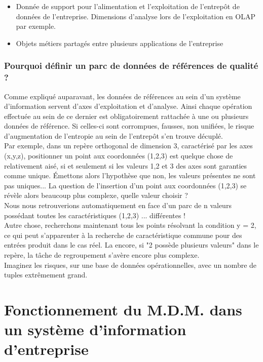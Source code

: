 \begin{itemize}
\item Donnée de support pour l'alimentation et l'exploitation de l'entrepôt de données de l'entreprise. Dimensions d'analyse lors de l'exploitation en OLAP par exemple.
\item Objets métiers partagés entre plusieurs applications de l'entreprise
\end{itemize}

\subsubsection{Pourquoi définir un parc de données de références de qualité ?}

Comme expliqué auparavant, les données de références au sein d'un système d'information servent d'axes d'exploitation et d'analyse. Ainsi chaque opération effectuée au sein de ce dernier est obligatoirement rattachée à une ou plusieurs données de référence. Si celles-ci sont corrompues, fausses, non unifiées, le risque d'augmentation de l'entropie au sein de l'entrepôt s'en trouve décuplé.\\
Par exemple, dans un repère orthogonal de dimension 3, caractérisé par les axes (x,y,z), positionner un point aux coordonnées (1,2,3) est quelque chose de relativement aisé, si et seulement si les valeurs 1,2 et 3 des axes sont garanties comme unique.
Émettons alors l'hypothèse que non, les valeurs présentes ne sont pas uniques... La question de l'insertion d'un point aux coordonnées (1,2,3) se révèle alors beaucoup plus complexe, quelle valeur choisir ? \\ 
Nous nous retrouverions automatiquement en face d'un parc de n valeurs possédant toutes les caractéristiques (1,2,3) ... différentes !\\
Autre chose, recherchons maintenant tous les points résolvant la condition y = 2, ce qui peut s'apparenter à la recherche de caractéristique commune pour des entrées produit dans le cas réel.
La encore, si "2 possède plusieurs valeurs" dans le repère, la tâche de regroupement s'avère encore plus complexe.\\
Imaginez les risques, sur une base de données opérationnelles, avec un nombre de tuples extrêmement grand.\\

\section{Fonctionnement du M.D.M. dans un système d'information d'entreprise}

